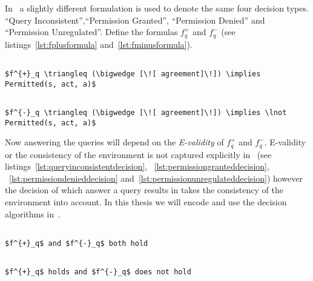 In~\cite{pucella2006} a slightly different formulation is used to denote the same four decision types. ``Query Inconsistent'',``Permission Granted'', ``Permission Denied'' and ``Permission Unregulated''. Define the formulas $f^{+}_q$ and $f^{-}_q$ (see listings~\ref{lst:fplusformula} and~\ref{lst:fminusformula}).

\lstset{mathescape, language=AST} 
\begin{lstlisting}[frame=single, caption={$f^{+}_q$},label={lst:fplusformula}]

$f^{+}_q \triangleq (\bigwedge [\![ agreement]\!]) \implies Permitted(s, act, a)$ 

\end{lstlisting}

\lstset{mathescape, language=AST} 
\begin{lstlisting}[frame=single, caption={$f^{-}_q$},label={lst:fminusformula}]

$f^{-}_q \triangleq (\bigwedge [\![ agreement]\!]) \implies \lnot Permitted(s, act, a)$ 

\end{lstlisting}

Now answering the queries will depend on the \emph{E-validity} of $f^{+}_q$ and $f^{-}_q$. E-validity or the consistency of the environment is not captured explicitly in~\cite{pucella2006} (see listings~\ref{lst:queryinconsistentdecision}, ~\ref{lst:permissiongranteddecision}, ~\ref{lst:permissiondenieddecision} and~\ref{lst:permissionunregulateddecision}) however the decision of which answer a query results in takes the consistency of the environment into account. In this thesis we will encode and use the decision algorithms in~\cite{pucella2006}.


\lstset{mathescape, language=AST} 
\begin{lstlisting}[frame=single, caption={Answerable Queries: Query Inconsistent},label={lst:queryinconsistentdecision}]

$f^{+}_q$ and $f^{-}_q$ both hold

\end{lstlisting}

\lstset{mathescape, language=AST} 
\begin{lstlisting}[frame=single, caption={Answerable Queries: Permission Granted},label={lst:permissiongranteddecision}]

$f^{+}_q$ holds and $f^{-}_q$ does not hold

\end{lstlisting}

